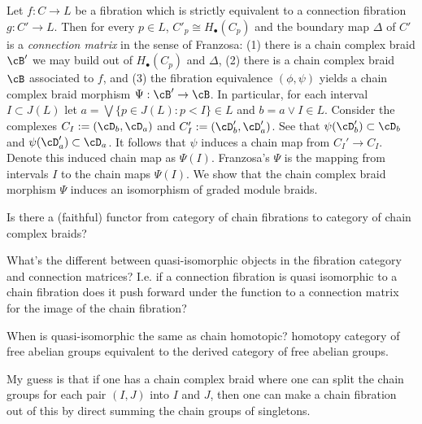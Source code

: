 \begin{thm}
Let $f:C\to L$ be a fibration which is strictly equivalent to a connection fibration $g:C'\to L$.  Then for every $p\in L$, $C'_p\cong H_\bullet(C_p)$ and the boundary map $\Delta$ of $C'$ is a {\em connection matrix} in the sense of Franzosa: (1) there is a chain complex braid $\cB'$ we may build out of $H_\bullet(C_p)$ and $\Delta$, (2) there is a chain complex braid $\cB$ associated to $f$, and (3) the fibration equivalence $(\phi,\psi)$ yields a chain complex braid morphism $\Psi:\cB'\to \cB$.  In particular, for each interval $I\subset J(L)$ let $a = \bigvee \{p\in J(L):p < I\}\in L$ and $b=a\vee I\in L$.  Consider the complexes $C_I:=(\cD_b, \cD_a)$ and $C_I':= (\cD_b',\cD_a')$.  See that $\psi(\cD'_b)\subset \cD_b$ and $\psi(\cD_a')\subset \cD_a$.  It follows that $\psi$ induces a chain map from $C_I'\to C_I$.  Denote this induced chain map as $\Psi(I)$.  Franzosa's $\Psi$ is the mapping from intervals $I$ to the chain maps $\Psi(I)$.  We show that the chain complex braid morphism $\Psi$ induces an isomorphism of graded module braids.
\end{thm}


\begin{rem}
Is there a (faithful) functor from category of chain fibrations to category of chain complex braids? 
\end{rem}

\begin{rem}
What's the different between quasi-isomorphic objects in the fibration category and connection matrices?  I.e. if a connection fibration is quasi isomorphic to a chain fibration does it push forward under the function to a connection matrix for the image of the chain fibration?
\end{rem}

\begin{rem}
When is quasi-isomorphic the same as chain homotopic? homotopy category of free abelian groups equivalent to the derived category of free abelian groups.
\end{rem}

\begin{rem}
My guess is that if one has a chain complex braid where one can split the chain groups for each pair $(I,J)$ into $I$ and $J$, then one can make a chain fibration out of this by direct summing the chain groups of singletons.  %
\end{rem}


